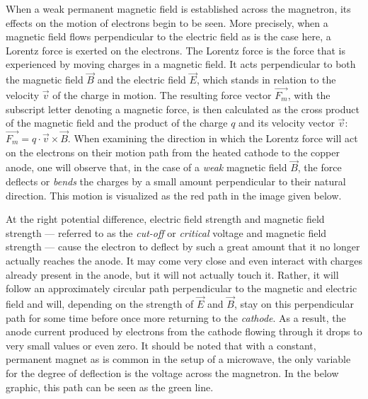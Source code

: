 
When a weak permanent magnetic field is established across the magnetron, its effects on the motion of electrons begin to be seen. More precisely, when a magnetic field flows perpendicular to the electric field as is the case here, a Lorentz force is exerted on the electrons. The Lorentz force is the force that is experienced by moving charges in a magnetic field. It acts perpendicular to both the magnetic field $\vec{B}$ and the electric field $\vec{E}$, which stands in relation to the velocity $\vec{v}$ of the charge in motion. The resulting force vector $\vec{F_m}$, with the subscript letter denoting a magnetic force, is then calculated as the cross product of the magnetic field and the product of the charge $q$ and its velocity vector $\vec{v}$: $\vec{F_m} = q \cdot \vec{v} \times \vec{B}$. When examining the direction in which the Lorentz force will act on the electrons on their motion path from the heated cathode to the copper anode, one will observe that, in the case of a \emph{weak} magnetic field $\vec{B}$, the force deflects or \emph{bends} the charges by a small amount perpendicular to their natural direction. This motion is visualized as the red path in the image given below.


At the right potential difference, electric field strength and magnetic field strength --- referred to as the \emph{cut-off} or \emph{critical} voltage and magnetic field strength --- cause the electron to deflect by such a great amount that it no longer actually reaches the anode. It may come very close and even interact with charges already present in the anode, but it will not actually touch it. Rather, it will follow an approximately circular path perpendicular to the magnetic and electric field and will, depending on the strength of $\vec{E}$ and $\vec{B}$, stay on this perpendicular path for some time before once more returning to the \emph{cathode}. As a result, the anode current produced by electrons from the cathode flowing through it drops to very small values or even zero. It should be noted that with a constant, permanent magnet as is common in the setup of a microwave, the only variable for the degree of deflection is the voltage across the magnetron. In the below graphic, this path can be seen as the green line.

